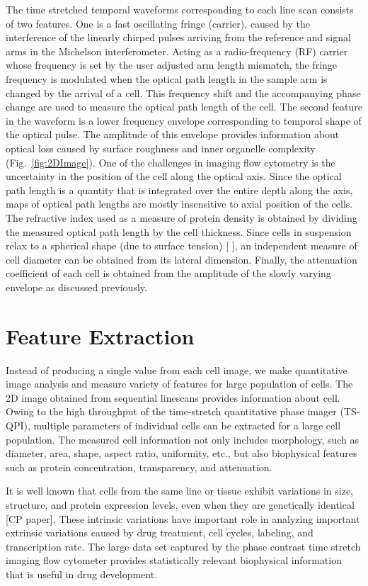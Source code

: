 \documentclass[aps,pra,reprint,superscriptaddress]{revtex4-1}
\begin{document}
The time stretched temporal waveforms corresponding to each line scan consists of two features. One is a fast oscillating fringe (carrier), caused by the interference of the linearly chirped pulses arriving from the reference and signal arms in the Michelson interferometer. Acting as a radio-frequency (RF) carrier whose frequency is set by the user adjusted arm length mismatch, the fringe frequency is modulated when the optical path length in the sample arm is changed by the arrival of a cell. This frequency shift and the accompanying phase change are used to measure the optical path length of the cell. The second feature in the waveform is a lower frequency envelope corresponding to temporal shape of the optical pulse. The amplitude of this envelope provides information about optical loss caused by surface roughness and inner organelle complexity (Fig.~\ref{fig:2DImage}). 
One of the challenges in imaging flow cytometry is the uncertainty in the position of the cell along the optical axis. Since the optical path length is a quantity that is integrated over the entire depth along the axis, maps of optical path lengths are mostly insensitive to axial position of the cells. The refractive index used as a measure of protein density is obtained by dividing the measured optical path length by the cell thickness. Since cells in suspension relax to a spherical shape (due to surface tension) [ ], an independent measure of cell diameter can be obtained from its lateral dimension. 
Finally, the attenuation coefficient of each cell is obtained from the amplitude of the slowly varying envelope as discussed previously.

\section{Feature Extraction}

Instead of producing a single value from each cell image, we make quantitative image analysis and measure variety of features for large population of cells. The 2D image obtained from sequential linescans provides information about cell. Owing to the high throughput of the time-stretch quantitative phase imager (TS-QPI), multiple parameters of individual cells can be extracted for a large cell population. The measured cell information not only includes morphology, such as diameter, area, shape, aspect ratio, uniformity, etc., but also biophysical features such as protein concentration, transparency, and attenuation.

It is well known that cells from the same line or tissue exhibit variations in size, structure, and protein expression levels, even when they are genetically identical [CP paper]. These intrinsic variations have important role in analyzing important extrinsic variations caused by drug treatment, cell cycles, labeling, and transcription rate. The large data set captured by the phase contrast time stretch imaging flow cytometer provides statistically relevant biophysical information that is useful in drug development.
\end{document}
